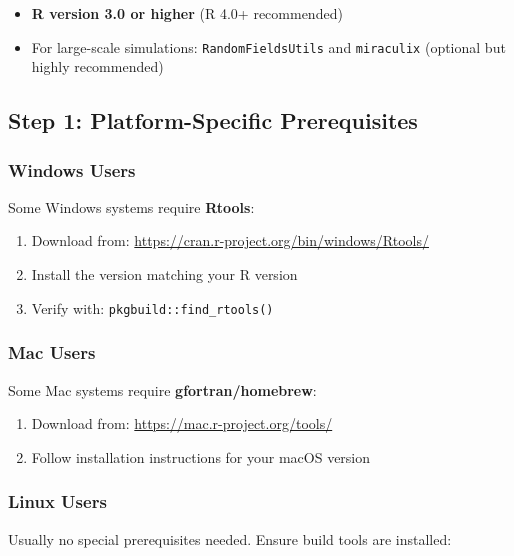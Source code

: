 \documentclass[
  letterpaper,
]{book}
\providecommand{\tightlist}{%
  \setlength{\itemsep}{0pt}\setlength{\parskip}{0pt}}
\begin{document}
\begin{itemize}
\tightlist
\item
  \textbf{R version 3.0 or higher} (R 4.0+ recommended)
\item
  For large-scale simulations: \texttt{RandomFieldsUtils} and
  \texttt{miraculix} (optional but highly recommended)
\end{itemize}

\subsection{Step 1: Platform-Specific
Prerequisites}\label{step-1-platform-specific-prerequisites}

\subsubsection{Windows Users}\label{windows-users}

Some Windows systems require \textbf{Rtools}:

\begin{enumerate}
\def\labelenumi{\arabic{enumi}.}
\tightlist
\item
  Download from: \url{https://cran.r-project.org/bin/windows/Rtools/}
\item
  Install the version matching your R version
\item
  Verify with: \texttt{pkgbuild::find\_rtools()}
\end{enumerate}

\subsubsection{Mac Users}\label{mac-users}

Some Mac systems require \textbf{gfortran/homebrew}:

\begin{enumerate}
\def\labelenumi{\arabic{enumi}.}
\tightlist
\item
  Download from: \url{https://mac.r-project.org/tools/}
\item
  Follow installation instructions for your macOS version
\end{enumerate}

\subsubsection{Linux Users}\label{linux-users}

Usually no special prerequisites needed. Ensure build tools are
installed:
\end{document}
